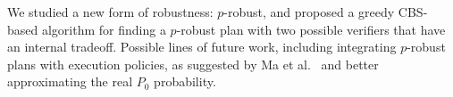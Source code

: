 \documentclass[letterpaper]{article} %
\begin{document}
We studied a new form of robustness: $p$-robust, and proposed a greedy CBS-based algorithm for finding a $p$-robust plan with two possible verifiers that have an internal tradeoff. Possible lines of future work, including integrating $p$-robust plans with execution policies, as suggested by Ma et al.~ and better approximating the real $P_0$ probability.






\end{document}
